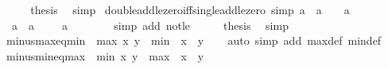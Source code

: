 \begin{isabellebody}
\ \ \isamarkupfalse%
\ \isamarkupfalse%
\ {\isacharquery}{\kern0pt}thesis\ \isamarkupfalse%
\ simp\isanewline
{}\isamarkupfalse%
%
\endisatagproof
{\isafoldproof}%
%
\isadelimproof
\isanewline
%
\endisadelimproof
\isanewline
{}\isamarkupfalse%
\ double{\isacharunderscore}{\kern0pt}add{\isacharunderscore}{\kern0pt}le{\isacharunderscore}{\kern0pt}zero{\isacharunderscore}{\kern0pt}iff{\isacharunderscore}{\kern0pt}single{\isacharunderscore}{\kern0pt}add{\isacharunderscore}{\kern0pt}le{\isacharunderscore}{\kern0pt}zero\ {\isacharbrackleft}{\kern0pt}simp{\isacharbrackright}{\kern0pt}{\isacharcolon}{\kern0pt}\ {\isachardoublequoteopen}a\ {\isacharplus}{\kern0pt}\ a\ {\isasymle}\ {}\ {\isasymlongleftrightarrow}\ a\ {\isasymle}\ {}{\isachardoublequoteclose}\isanewline
%
\isadelimproof
%
\endisadelimproof
%
\isatagproof
{}\isamarkupfalse%
\ {\isacharminus}{\kern0pt}\isanewline
\ \ \isamarkupfalse%
\ {\isachardoublequoteopen}{\isasymnot}\ a\ {\isacharplus}{\kern0pt}\ a\ {\isasymle}\ {}\ {\isasymlongleftrightarrow}\ {\isasymnot}\ a\ {\isasymle}\ {}{\isachardoublequoteclose}\isanewline
\ \ \ \ \isamarkupfalse%
\ {\isacharparenleft}{\kern0pt}simp\ add{\isacharcolon}{\kern0pt}\ not{\isacharunderscore}{\kern0pt}le{\isacharparenright}{\kern0pt}\isanewline
\ \ \isamarkupfalse%
\ \isamarkupfalse%
\ {\isacharquery}{\kern0pt}thesis\ \isamarkupfalse%
\ simp\isanewline
{}\isamarkupfalse%
%
\endisatagproof
{\isafoldproof}%
%
\isadelimproof
\isanewline
%
\endisadelimproof
\isanewline
{}\isamarkupfalse%
\ minus{\isacharunderscore}{\kern0pt}max{\isacharunderscore}{\kern0pt}eq{\isacharunderscore}{\kern0pt}min{\isacharcolon}{\kern0pt}\ {\isachardoublequoteopen}{\isacharminus}{\kern0pt}\ max\ x\ y\ {\isacharequal}{\kern0pt}\ min\ {\isacharparenleft}{\kern0pt}{\isacharminus}{\kern0pt}\ x{\isacharparenright}{\kern0pt}\ {\isacharparenleft}{\kern0pt}{\isacharminus}{\kern0pt}\ y{\isacharparenright}{\kern0pt}{\isachardoublequoteclose}\isanewline
%
\isadelimproof
\ \ %
\endisadelimproof
%
\isatagproof
{}\isamarkupfalse%
\ {\isacharparenleft}{\kern0pt}auto\ simp\ add{\isacharcolon}{\kern0pt}\ max{\isacharunderscore}{\kern0pt}def\ min{\isacharunderscore}{\kern0pt}def{\isacharparenright}{\kern0pt}%
\endisatagproof
{\isafoldproof}%
%
\isadelimproof
\isanewline
%
\endisadelimproof
\isanewline
{}\isamarkupfalse%
\ minus{\isacharunderscore}{\kern0pt}min{\isacharunderscore}{\kern0pt}eq{\isacharunderscore}{\kern0pt}max{\isacharcolon}{\kern0pt}\ {\isachardoublequoteopen}{\isacharminus}{\kern0pt}\ min\ x\ y\ {\isacharequal}{\kern0pt}\ max\ {\isacharparenleft}{\kern0pt}{\isacharminus}{\kern0pt}\ x{\isacharparenright}{\kern0pt}\ {\isacharparenleft}{\kern0pt}{\isacharminus}{\kern0pt}\ y{\isacharparenright}{\kern0pt}{\isachardoublequoteclose}\isanewline

\end{isabellebody}
